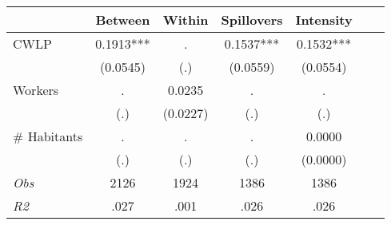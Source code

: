 \begin{tabular}{l*{6}{c}}\hline&\multicolumn{1}{c}{Between}&\multicolumn{1}{c}{Within}&\multicolumn{1}{c}{Spillovers}&\multicolumn{1}{c}{Intensity}\\ \hline 
CWLP & 0.1913*** & . & 0.1537*** & 0.1532*** \\
 & (0.0545) & (.) & (0.0559) & (0.0554) \\
Workers & . & 0.0235 & . & . \\
 & (.) & (0.0227) & (.) & (.) \\
\# Habitants & . & . & . & 0.0000 \\
  & (.) & (.) & (.) & (0.0000) \\
\hline \textit{Obs} & 2126 & 1924 & 1386 & 1386  \\ \textit{R2} & .027 & .001 & .026 & .026 \\ \hline \end{tabular}
